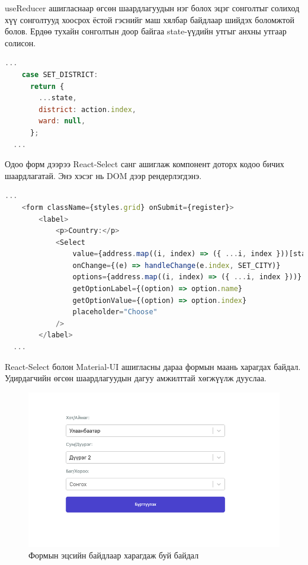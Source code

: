 useReducer ашигласнаар өгсөн шаардлагуудын нэг болох эцэг сонголтыг солиход хүү сонголтууд хоосрох ёстой гэснийг маш хялбар байдлаар шийдэх боломжтой болов. Ердөө тухайн сонголтын доор байгаа state-үүдийн утгыг анхны утгаар солисон.

\begin{lstlisting}[language=Javascript, caption=Хүү сонголтуудыг цэвэрлэх, frame=single]
	...
    case SET_DISTRICT:
      return {
        ...state,
        district: action.index,
        ward: null,
      };
  ...
\end{lstlisting}

Одоо форм дээрээ React-Select санг ашиглаж компонент доторх кодоо бичих шаардлагатай. Энэ хэсэг нь DOM дээр рендерлэгдэнэ. 

\begin{lstlisting}[language=Javascript, caption=React-Select ашигласан байдал, frame=single]
	...  
	<form className={styles.grid} onSubmit={register}>
		<label>
			<p>Country:</p>
			<Select
				value={address.map((i, index) => ({ ...i, index }))[state.city]}
				onChange={(e) => handleChange(e.index, SET_CITY)}
				options={address.map((i, index) => ({ ...i, index }))}
				getOptionLabel={(option) => option.name}
				getOptionValue={(option) => option.index}
				placeholder="Choose"
			/>
		</label>
  ...
\end{lstlisting}
\pagebreak

React-Select болон Material-UI ашигласны дараа формын маань харагдах байдал. Удирдагчийн өгсөн шаардлагуудын дагуу амжилттай хөгжүүлж дууслаа.
\begin{figure}
	\centering
	\includegraphics[width=15cm]{images/form.png}
	\caption{Формын эцсийн байдлаар харагдаж буй байдал}
	\label{fig:my_label}
\end{figure}

